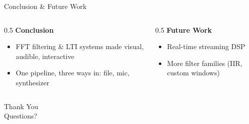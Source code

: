 \begin{frame}{Conclusion \& Future Work}
  \begin{columns}[T, totalwidth=\textwidth]
    \begin{column}{0.5\textwidth}
      \textbf{Conclusion}
      \begin{itemize}
        \item FFT filtering \& LTI systems made visual, audible, interactive
        \item One pipeline, three ways in: file, mic, synthesizer
      \end{itemize}
    \end{column}
    \begin{column}{0.5\textwidth}
      \textbf{Future Work}
      \begin{itemize}
        \item Real-time streaming DSP
        \item More filter families (IIR, custom windows)
      \end{itemize}
    \end{column}
  \end{columns}

  \vspace{0.7cm}
  \centering
  {\Huge\alert{Thank You}}\\[6pt]
  {\Large Questions?}
\end{frame}
